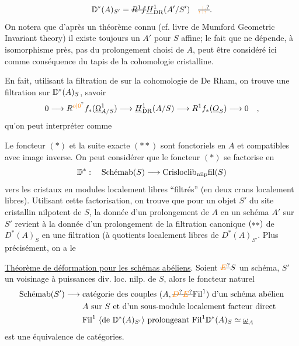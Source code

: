 \[
\mathbb{D}^{\handwritten{*}}(A)_{S'}=\deleted{R^1 f}\underline{H}_{\mathrm{DR}}^1(A'/S')\quad\deleted{\unsure{,|;}}.
\]
On notera que d'après un théorème connu (cf. livre de Mumford Geometric Invariant theory) il existe toujours un $A'$ pour $S$ affine; le fait que  ne dépende, à isomorphisme près, pas du prolongement choisi de $A$, peut être considéré ici comme conséquence du tapis de la cohomologie cristalline.

En fait, utilisant la filtration de  sur la cohomologie de De Rham, on trouve une filtration sur $\mathbb{D}^{*}(A)_S$, savoir
\[
0\handwritten{\longrightarrow}R^{\unsure{o|0}} f_{\handwritten{*}}(\underline{\handwritten{\Omega}}^1_{A/S})\handwritten{\longrightarrow}\underline{H}_{\mathrm{DR}}^1(A/S)\handwritten{\longrightarrow}R^1 f_*(\underline{O}_S)\handwritten{\longrightarrow}0\quad,
\]
qu'on peut interpréter comme

Le foncteur $(*)$ et la suite exacte $(**)$ sont fonctoriels en $A$ et compatibles avec image inverse. On peut  considérer que le foncteur $(*)$ se factorise en
\[
\mathbb{D}^*:\quad\text{Schémab}(S)\longrightarrow\mathrm{Crisloclib}_{\mathrm{nilp}}\mathrm{fil}(S)
\]
vers les cristaux en modules localement libres ``filtrés'' (en deux crans localement libres). Utilisant cette factorisation, on trouve que pour un objet $S'$ du site cristallin nilpotent de $S$, la\unsure{,|{}} donnée d'un prolongement de $A$ en un schéma  $A'$ sur $S'$ revient à la donnée d'un prolongement de la filtration canonique $(**)$ de $D^*(A)_S$ en une filtration (à quotients localement libres\handwritten{)} de $D^*(A)_{S'}$. Plus précisément, on a le

\uline{Théorème de déformation pour les schémas abéliens}. Soient $\deleted{\unsure{E}}S$ un schéma, $S'$ un voisinage à puissances div. loc. nilp. de $S$, alors le foncteur naturel
\[
\begin{aligned}
\text{Schémab}(S')\handwritten{\longrightarrow}{}&
\text{catégorie des couples }(A,\deleted{\unsure{D}}\deleted{\unsure{E}}\mathrm{Fil}^1)\text{ d'un schéma abélien}\\
& A\text{ sur }S\text{ et d'un sous-module localement facteur direct}\\
&\mathrm{Fil}^1\ \inserted{\text{de }\mathbb{D}^*(A)_{S'}}\text{ prolongeant }\mathrm{Fil}^1\mathbb{D}^*(A)_S\handwritten{\simeq\underline{\omega}}_A
\end{aligned}
\]
est une équivalence de catégories.

